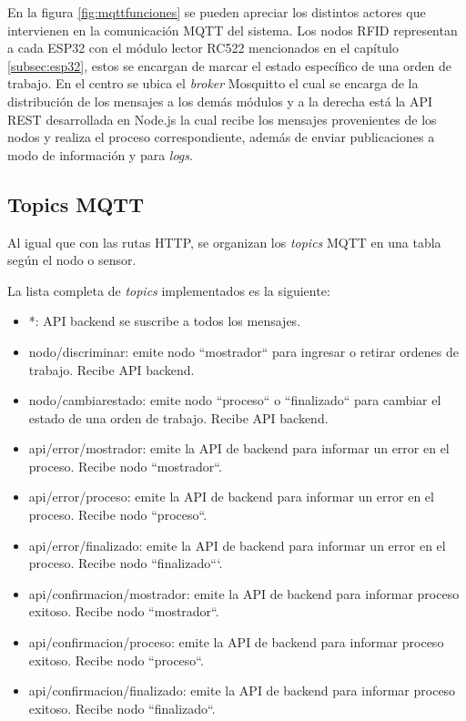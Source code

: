 En la figura \ref{fig:mqttfunciones} se pueden apreciar los distintos actores que intervienen en la comunicación MQTT del sistema. Los nodos RFID representan a cada ESP32 con el módulo lector RC522 mencionados en el capítulo \ref{subsec:esp32}, estos se encargan de marcar el estado específico de una orden de trabajo. En el centro se ubica el \textit{broker} Mosquitto el cual se encarga de la distribución de los mensajes a los demás módulos y a la derecha está la API REST desarrollada en Node.js la cual recibe los mensajes provenientes de los nodos y realiza el proceso correspondiente, además de enviar publicaciones a modo de información y para \textit{logs}.

\subsection{Topics MQTT}
\label{subsec:mqtttopics}

Al igual que con las rutas HTTP, se organizan los \textit{topics} MQTT en una tabla según el nodo o sensor.

La lista completa de \textit{topics} implementados es la siguiente:
\begin{itemize}
\item *: API backend se suscribe a todos los mensajes.
\item nodo/discriminar: emite nodo ``mostrador`` para ingresar o retirar ordenes de trabajo. Recibe API backend.
\item nodo/cambiarestado: emite nodo ``proceso`` o ``finalizado`` para cambiar el estado de una orden de trabajo. Recibe API backend.
\item api/error/mostrador: emite la API de backend para informar un error en el proceso. Recibe nodo ``mostrador``.
\item api/error/proceso: emite la API de backend para informar un error en el proceso. Recibe nodo ``proceso``.
\item api/error/finalizado: emite la API de backend para informar un error en el proceso. Recibe nodo ``finalizado```.
\item api/confirmacion/mostrador: emite la API de backend para informar proceso exitoso. Recibe nodo ``mostrador``.
\item api/confirmacion/proceso: emite la API de backend para informar proceso exitoso. Recibe nodo ``proceso``.
\item api/confirmacion/finalizado: emite la API de backend para informar proceso exitoso. Recibe nodo ``finalizado``.

\end{itemize}

